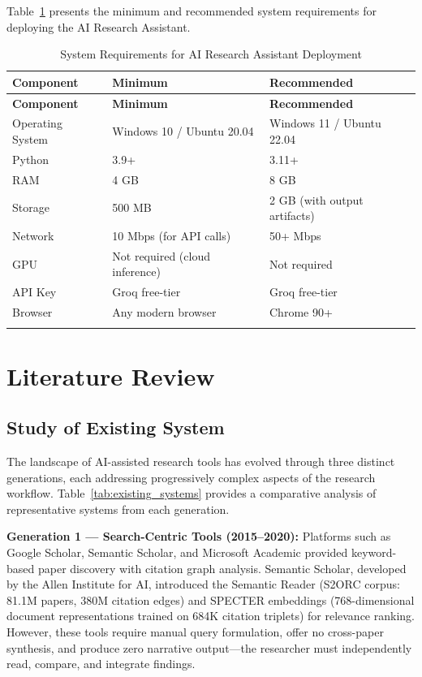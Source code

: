\documentclass[a4paper,12pt,openany]{report}
\begin{document}
Table~\ref{tab:sysreq} presents the minimum and recommended system requirements for deploying the AI Research Assistant.

\begin{longtable}{|p{3cm}|p{5cm}|p{5cm}|}
\hline
\textbf{Component} & \textbf{Minimum} & \textbf{Recommended} \\
\hline
\endfirsthead
\hline
\textbf{Component} & \textbf{Minimum} & \textbf{Recommended} \\
\hline
\endhead
\hline
\endfoot
Operating System & Windows 10 / Ubuntu 20.04 & Windows 11 / Ubuntu 22.04 \\
\hline
Python & 3.9+ & 3.11+ \\
\hline
RAM & 4 GB & 8 GB \\
\hline
Storage & 500 MB & 2 GB (with output artifacts) \\
\hline
Network & 10 Mbps (for API calls) & 50+ Mbps \\
\hline
GPU & Not required (cloud inference) & Not required \\
\hline
API Key & Groq free-tier & Groq free-tier \\
\hline
Browser & Any modern browser & Chrome 90+ \\
\hline
\caption{System Requirements for AI Research Assistant Deployment}
\label{tab:sysreq}
\end{longtable}


\chapter{Literature Review}

\section{Study of Existing System}

The landscape of AI-assisted research tools has evolved through three distinct generations, each addressing progressively complex aspects of the research workflow. Table~\ref{tab:existing_systems} provides a comparative analysis of representative systems from each generation.

\textbf{Generation 1 --- Search-Centric Tools (2015--2020):} Platforms such as Google Scholar, Semantic Scholar, and Microsoft Academic provided keyword-based paper discovery with citation graph analysis. Semantic Scholar, developed by the Allen Institute for AI, introduced the Semantic Reader (S2ORC corpus: 81.1M papers, 380M citation edges) and SPECTER embeddings (768-dimensional document representations trained on 684K citation triplets) for relevance ranking. However, these tools require manual query formulation, offer no cross-paper synthesis, and produce zero narrative output---the researcher must independently read, compare, and integrate findings.
\end{document}

